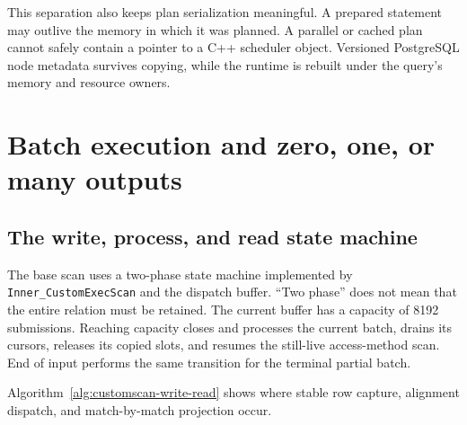 This separation also keeps plan serialization meaningful.  A prepared
statement may outlive the memory in which it was planned.  A parallel or
cached plan cannot safely contain a pointer to a C++ scheduler object.
Versioned PostgreSQL node metadata survives copying, while the runtime is
rebuilt under the query's memory and resource owners.

\section{Batch execution and zero, one, or many outputs}
\label{sec:customscan-batch-state-machine}

\subsection{The write, process, and read state machine}

The base scan uses a two-phase state machine implemented by
\texttt{Inner\_CustomExecScan} and the dispatch buffer.  ``Two phase'' does
not mean that the entire relation must be retained.  The current buffer has a
capacity of 8192 submissions.  Reaching capacity closes and processes the
current batch, drains its cursors, releases its copied slots, and resumes the
still-live access-method scan.  End of input performs the same transition for
the terminal partial batch.

Algorithm~\ref{alg:customscan-write-read} shows where stable row capture,
alignment dispatch, and match-by-match projection occur.

